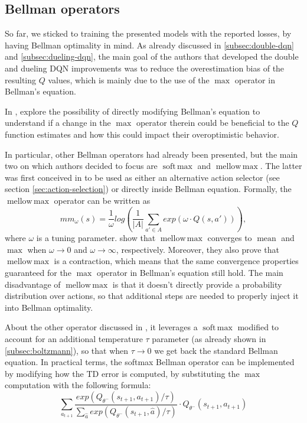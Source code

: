 \documentclass[a4paper,10pt]{report}
\DeclareMathOperator*{\softmax}{soft\,max}
\DeclareMathOperator*{\mellowmax}{mellow\,max}
\DeclareMathOperator*{\mean}{mean}
\begin{document}
\subsection{Bellman operators}\label{subsec:bellman-operators}
So far, we sticked to training the presented models with the reported losses, by having Bellman optimality in mind. As already discussed in \ref{subsec:double-dqn} and \ref{subsec:dueling-dqn}, the main goal of the authors that developed the double and dueling DQN improvements was to reduce the overestimation bias of the resulting $Q$ values, which is mainly due to the use of the $\max$ operator in Bellman's equation.

In \cite{softmax-bellman}, \citeauthor{softmax-bellman} explore the possibility of directly modifying Bellman's equation to understand if a change in the $\max$ operator therein could be beneficial to the $Q$ function estimates and how this could impact their overoptimistic behavior.

In particular, other Bellman operators had already been presented, but the main two on which authors decided to focus are $\softmax$ and $\mellowmax$. The latter was first conceived in \cite{mellowmax-bellman} to be used as either an alternative action selector (see section \ref{sec:action-selection}) or directly inside Bellman equation. Formally, the $\mellowmax$ operator can be written as
$$
mm_\omega(s) = \frac{1}{\omega}log\left(\frac{1}{|A|} \sum_{a'\in A} exp(\omega \cdot Q(s,a'))\right),
$$ 
where $\omega$ is a tuning parameter. \citeauthor{mellowmax-bellman} show that $\mellowmax$ converges to $\mean$ and $\max$ when $\omega\rightarrow 0$ and $\omega\rightarrow \infty$, respectively. Moreover, they also prove that $\mellowmax$ is a contraction, which means that the same convergence properties guaranteed for the $\max$ operator in Bellman's equation still hold. The main disadvantage of $\mellowmax$ is that it doesn't directly provide a probability distribution over actions, so that additional steps are needed to properly inject it into Bellman optimality.

About the other operator discussed in \cite{softmax-bellman}, it leverages a $\softmax$ modified to account for an additional temperature $\tau$ parameter (as already shown in \ref{subsec:boltzmann}), so that when $\tau\rightarrow 0$ we get back the standard Bellman equation. In practical terms, the softmax Bellman operator can be implemented by modifying how the TD error is computed, by substituting the $\max$ computation with the following formula:
$$
\sum_{a_{t+1}}\frac{exp(Q_{\theta^-}(s_{t+1}, a_{t+1})/\tau)}{\sum_{\hat{a}}exp(Q_{\theta^-}(s_{t+1}, \hat{a})/\tau)}\cdot Q_{\theta^-}(s_{t+1},a_{t+1})
$$
\end{document}
